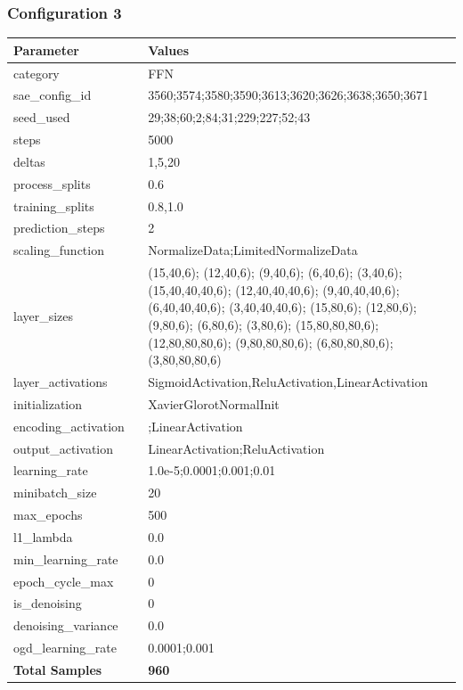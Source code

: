 \documentclass[a4paper,11pt,oneside]{article}
\theoremstyle{plain}
\theoremstyle{definition}
\begin{document}
	\subsubsection{Configuration 3}\label{config3}
	\begin{longtable}[H]{|p{0.3\linewidth}|p{0.7\linewidth}|} \hline 			\rowcolor{beaublue}\textbf{Parameter} &\textbf{Values} \\\hline{category} & {FFN} \\\hline
		{sae\_config\_id} & {3560;3574;3580;3590;3613;3620;3626;3638;3650;3671} \\\hline
		{seed\_used} & {29;38;60;2;84;31;229;227;52;43} \\\hline
		{steps} & {5000} \\\hline
		{deltas} & {1,5,20} \\\hline
		{process\_splits} & {0.6} \\\hline
		{training\_splits} & {0.8,1.0} \\\hline
		{prediction\_steps} & {2} \\\hline
		{scaling\_function} & {NormalizeData;LimitedNormalizeData} \\\hline
		{layer\_sizes} & {(15,40,6); (12,40,6); (9,40,6); (6,40,6); (3,40,6); (15,40,40,40,6); (12,40,40,40,6); (9,40,40,40,6); (6,40,40,40,6); (3,40,40,40,6); (15,80,6); (12,80,6); (9,80,6); (6,80,6); (3,80,6); (15,80,80,80,6); (12,80,80,80,6); (9,80,80,80,6); (6,80,80,80,6); (3,80,80,80,6)} \\\hline
		{layer\_activations} & {SigmoidActivation,ReluActivation,LinearActivation} \\\hline
		{initialization} & {XavierGlorotNormalInit} \\\hline
		{encoding\_activation} & {;LinearActivation} \\\hline
		{output\_activation} & {LinearActivation;ReluActivation} \\\hline
		{learning\_rate} & {1.0e-5;0.0001;0.001;0.01} \\\hline
		{minibatch\_size} & {20} \\\hline
		{max\_epochs} & {500} \\\hline
		{l1\_lambda} & {0.0} \\\hline
		{min\_learning\_rate} & {0.0} \\\hline
		{epoch\_cycle\_max} & {0} \\\hline
		{is\_denoising} & {0} \\\hline
		{denoising\_variance} & {0.0} \\\hline
		{ogd\_learning\_rate} & {0.0001;0.001} \\\hline
		{\textbf{Total Samples}} & {\textbf{960}} \\\hline
	\end{longtable}
	
\end{document}
